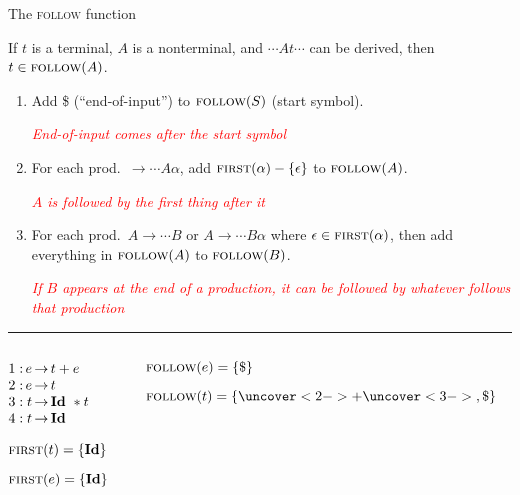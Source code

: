 \documentclass{plt}
\makeatletter
\newcommand{\id}{\textbf{Id}}
\newcommand{\grammarone}{
\renewcommand{\arraystretch}{1}
$\begin{array}[t]{@{}l@{\,}r@{\,}c@{\,}l@{}}
1: & e & \rightarrow & t + e \\
2: & e & \rightarrow & t \\
3: & t & \rightarrow & \id\ * t \\
4: & t & \rightarrow & \id
\end{array}$
}
\makeatother
\begin{document}
\begin{frame}{The \textsc{follow} function}

If $t$ is a terminal, $A$ is a nonterminal, and $\cdots A t \cdots$
can be derived, then $t \in \textsc{follow}(A)$.

\begin{enumerate}
\item Add \$ (``end-of-input'') to $\textsc{follow}(S)$ (start symbol).

  \textcolor{red}{\emph{End-of-input comes after the start symbol}}

\item For each prod.\ $\rightarrow \cdots A \alpha$, add
  $\textsc{first}(\alpha) - \{ \epsilon \}$ to $\textsc{follow}(A)$.

  \textcolor{red}{\emph{$A$ is followed by the first thing after it}}

\item For each prod.\ $A \rightarrow \cdots B$ or $A \rightarrow
  \cdots B \alpha$ where $\epsilon \in \textsc{first}(\alpha)$, then add
  everything in $\textsc{follow}(A)$ to $\textsc{follow}(B)$.

  \textcolor{red}{\emph{If $B$ appears at the end of a production, it
      can be followed by whatever follows that production}}

\end{enumerate}

\hrule

\vspace{5pt}

\begin{columns}
\begin{column}[t]{0.3\textwidth}
\grammarone

$\first(t) = \{\id\}$

$\first(e) = \{\id\}$
\end{column}
\begin{column}[t]{0.7\textwidth}
$\textsc{follow}(e) = \{ \$ \}$

$\follow(t) = \{ \uncover<2->{+} \uncover<3->{, \$} \}$

\medskip

%
%
%

\end{column}
\end{columns}

\end{frame}
\end{document}
